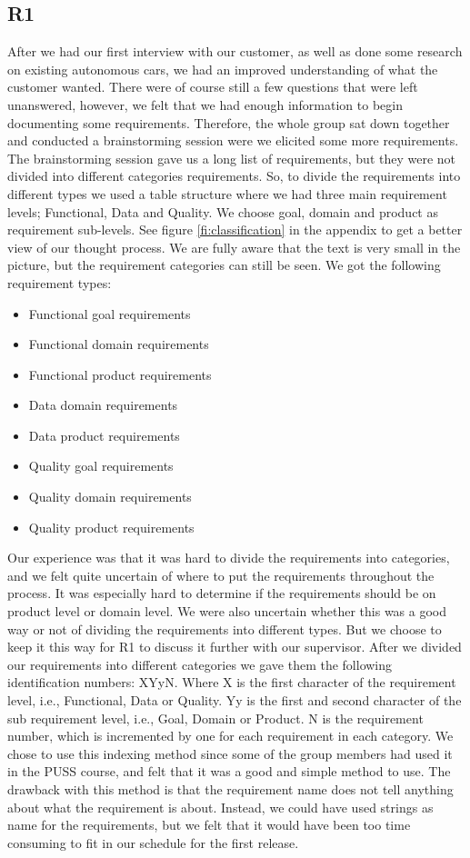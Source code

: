 \documentclass[10pt]{article}
\begin{document}
\subsection{R1}
After we had our first interview with our customer, as well as done some research on existing autonomous cars, we had an improved understanding of what the customer wanted. There were of course still a few questions that were left unanswered, however, we felt that we had enough information to begin documenting some requirements. Therefore, the whole group sat down together and conducted a brainstorming session were we elicited some more requirements. The brainstorming session gave us a long list of requirements, but they were not divided into different categories requirements. So, to divide the requirements into different types we used a table structure where we had three main requirement levels; Functional, Data and Quality. We choose goal, domain and product as requirement sub-levels. See figure \ref{fi:classification} in the appendix to get a better view of our thought process. We are fully aware that the text is very small in the picture, but the requirement categories can still be seen. We got the following requirement types:  
\begin{itemize}
\item Functional goal requirements
\item Functional domain requirements
\item Functional product requirements
\item Data domain requirements
\item Data product requirements
\item Quality goal requirements
\item Quality domain requirements
\item Quality product requirements
\end{itemize}
Our experience was that it was hard to divide the requirements into categories, and we felt quite uncertain of where to put the requirements throughout the process. It was especially hard to determine if the requirements should be on product level or domain level. We were also uncertain whether this was a good way or not of dividing the requirements into different types. But we choose to keep it this way for R1 to discuss it further with our supervisor. 
After we divided our requirements into different categories we gave them the following identification numbers: XYyN. Where X is the first character of the requirement level, i.e., Functional, Data or Quality. Yy is the first and second character of the sub requirement level, i.e., Goal, Domain or Product. N is the requirement number, which is incremented by one for each requirement in each category. We chose to use this indexing method since some of the group members had used it in the PUSS course, and felt that it was a good and simple method to use. The drawback with this method is that the requirement name does not tell anything about what the requirement is about. Instead, we could have used strings as name for the requirements, but we felt that it would have been too time consuming to fit in our schedule for the first release. 
\end{document}
